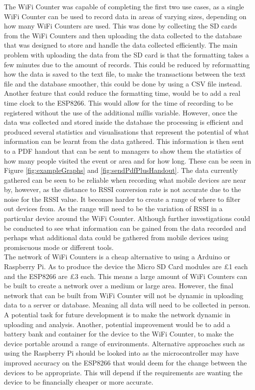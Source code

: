 \documentclass{report}
\begin{document}
The WiFi Counter was capable of completing the first two use cases, as a single WiFi Counter can be used to record data in areas of varying sizes, depending on how many WiFi Counters are used. This was done by collecting the SD cards from the WiFi Counters and then uploading the data collected to the database that was designed to store and handle the data collected efficiently. The main problem with uploading the data from the SD card is that the formatting takes a few minutes due to the amount of records. This could be reduced by reformatting how the data is saved to the text file, to make the transactions between the text file and the database smoother, this could be done by using a CSV file instead. Another feature that could reduce the formatting time, would be to add a real time clock to the ESP8266. This would allow for the time of recording to be registered without the use of the additional millis variable. However, once the data was collected and stored inside the database the processing is efficient and produced several statistics and visualisations that represent the potential of what information can be learnt from the data gathered. This information is then sent to a PDF handout that can be sent to managers to show them the statistics of how many people visited the event or area and for how long. These can be seen in Figure \ref{fig:exampleGraphs} and \ref{fig:sendPdfPlusHandout}. The data currently gathered can be seen to be reliable when recording what mobile devices are near by, however, as the distance to RSSI conversion rate is not accurate due to the noise for the RSSI value. It becomes harder to create a range of where to filter out devices from. As the range will need to be the variation of RSSI in a particular device around the WiFi Counter. Although further investigations could be conducted to see what information can be gained from the data recorded and perhaps what additional data could be gathered from mobile devices using promiscuous mode or different tools. \\ \newline
The network of WiFi Counters is a cheap alternative to using a Arduino or Raspberry Pi. As to produce the device the Micro SD Card modules are £1 each and the ESP8266 are £3 each. This means a large amount of WiFi Counters can be built to create a network over a medium or large area. However, the final network that can be built from WiFi Counter will not be dynamic in uploading data to a server or database. Meaning all data will need to be collected in person. A potential task for future development is to make the network dynamic in uploading and analysis. Another, potential improvement would be to add a battery bank and container for the device to the WiFi Counter, to make the device portable around a range of environments. Alternative approaches such as using the Raspberry Pi\cite{RaspberryPi} should be looked into as the microcontroller may have improved accuracy on the ESP8266 that would deem for the change between the devices to be appropriate. This will depend if the requirements are wanting the device to be financially cheaper or more accurate. \\ \newline
\end{document}
